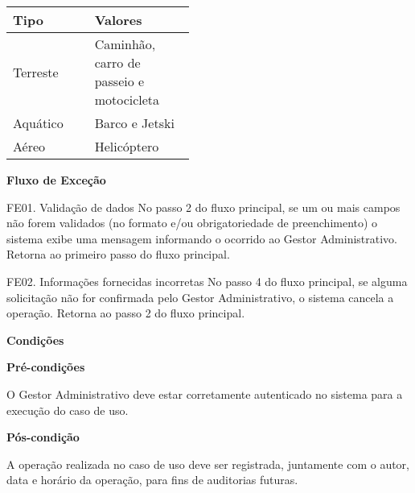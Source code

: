    \begin{table*}[!h]
    \centering
      \begin{tabular}{|p{0.20\linewidth}|p{0.25\linewidth}|}
      \hline
      Tipo & Valores\\
    
  \hline                               
  Terreste & Caminhão, carro de passeio e motocicleta\\

  \hline                               
  Aquático & Barco e Jetski\\

  \hline                               
  Aéreo & Helicóptero\\
  
  \hline     
        
      \end{tabular}
    \end{table*}

    
    
   {\raggedright
      \textbf{Fluxo de Exceção}
   }
   
   FE01. Validação de dados
	 No passo 2 do fluxo principal, se um ou mais campos não forem validados (no formato e/ou obrigatoriedade 
 de preenchimento) o sistema exibe uma mensagem informando o ocorrido ao Gestor Administrativo. Retorna ao 
 primeiro passo do fluxo principal.

    FE02. Informações fornecidas incorretas
     No passo 4 do fluxo principal, se alguma solicitação não for confirmada pelo Gestor Administrativo, o sistema 
 cancela a operação. Retorna ao passo 2 do fluxo principal.

 \vfill
 \pagebreak

	
   {\raggedright
      \textbf{Condições}
   }
   
    
   \textbf{Pré-condições}
   
   O Gestor Administrativo deve estar corretamente autenticado no sistema para a execução do caso de uso.
   
   \textbf{Pós-condição}
   
   A operação realizada no caso de uso deve ser registrada, juntamente com o autor, data e horário da operação, para fins de auditorias futuras.
  
  \vfill
  \pagebreak


   
